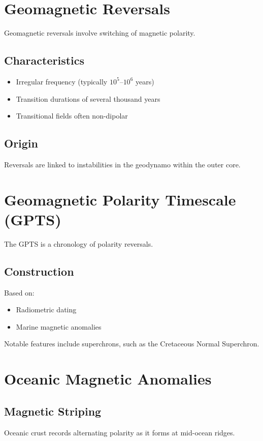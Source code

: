 \section{Geomagnetic Reversals}

Geomagnetic reversals involve switching of magnetic polarity.

\subsection{Characteristics}
\begin{itemize}
\item Irregular frequency (typically $10^5$--$10^6$ years)
\item Transition durations of several thousand years
\item Transitional fields often non-dipolar
\end{itemize}

\subsection{Origin}
Reversals are linked to instabilities in the geodynamo within the outer core.

\section{Geomagnetic Polarity Timescale (GPTS)}

The GPTS is a chronology of polarity reversals.

\subsection{Construction}
Based on:
\begin{itemize}
\item Radiometric dating
\item Marine magnetic anomalies
\end{itemize}

Notable features include superchrons, such as the Cretaceous Normal Superchron.

\section{Oceanic Magnetic Anomalies}

\subsection{Magnetic Striping}
Oceanic crust records alternating polarity as it forms at mid-ocean ridges.


